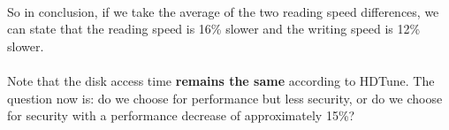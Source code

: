 $\;$ \\ \\
So in conclusion, if we take the average of the two reading speed differences, we can state that the reading speed is 16\% slower and the writing speed is 12\% slower. \\ \\
Note that the disk access time \textbf{remains the same} according to HDTune. The question now is: do we choose for performance but less security, or do we choose for security with a performance decrease of approximately 15\%?